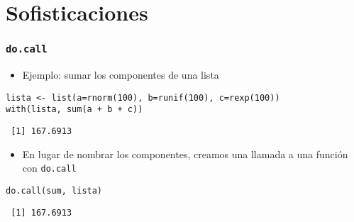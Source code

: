 \documentclass[xcolor={usenames,svgnames,dvipsnames}]{beamer}
\begin{document}
\section{Sofisticaciones}
\label{sec-4}
\begin{frame}[fragile]
\frametitle{\texttt{do.call}}
\label{sec-4-1}

\begin{itemize}
\item Ejemplo: sumar los componentes de una lista
\end{itemize}

\lstset{language=R}
\begin{lstlisting}
lista <- list(a=rnorm(100), b=runif(100), c=rexp(100))
with(lista, sum(a + b + c))
\end{lstlisting}

\begin{verbatim}
 [1] 167.6913
\end{verbatim}

\begin{itemize}
\item En lugar de nombrar los componentes, creamos una llamada a una
  función con \texttt{do.call}
\end{itemize}

\lstset{language=R}
\begin{lstlisting}
do.call(sum, lista)
\end{lstlisting}

\begin{verbatim}
 [1] 167.6913
\end{verbatim}
\end{frame}
\end{document}
